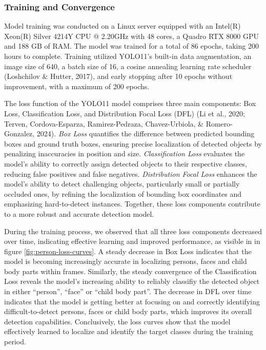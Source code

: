 \documentclass[
  man,floatsintext]{apa6}
\begin{document}
\subsubsection{Training and Convergence}\label{training-and-convergence}

Model training was conducted on a Linux server equipped with an Intel(R) Xeon(R) Silver 4214Y CPU @ 2.20GHz with 48 cores, a Quadro RTX 8000 GPU and 188 GB of RAM. The model was trained for a total of 86 epochs, taking 200 hours to complete. Training utilized YOLO11's built-in data augmentation, an image size of 640, a batch size of 16, a cosine annealing learning rate scheduler (Loshchilov \& Hutter, 2017), and early stopping after 10 epochs without improvement, with a maximum of 200 epochs.

The loss function of the YOLO11 model comprises three main components: Box Loss, Classification Loss, and Distribution Focal Loss (DFL) (Li et al., 2020; Terven, Cordova-Esparza, Ramirez-Pedraza, Chavez-Urbiola, \& Romero-Gonzalez, 2024). \emph{Box Loss} quantifies the difference between predicted bounding boxes and ground truth boxes, ensuring precise localization of detected objects by penalizing inaccuracies in position and size. \emph{Classification Loss} evaluates the model's ability to correctly assign detected objects to their respective classes, reducing false positives and false negatives. \emph{Distribution Focal Loss} enhances the model's ability to detect challenging objects, particularly small or partially occluded ones, by refining the localization of bounding box coordinates and emphasizing hard-to-detect instances. Together, these loss components contribute to a more robust and accurate detection model.

During the training process, we observed that all three loss components decreased over time, indicating effective learning and improved performance, as visible in in figure \ref{fig:person-loss-curves}. A steady decrease in Box Loss indicates that the model is becoming increasingly accurate in localizing persons, faces and child body parts within frames. Similarly, the steady convergence of the Classification Loss reveals the model's increasing ability to reliably classifiy the detected object in either ``person'', ``face'' or ``child body part''. The decrease in DFL over time indicates that the model is getting better at focusing on and correctly identifying difficult-to-detect persons, faces or child body parts, which improves its overall detection capabilities. Conclusively, the loss curves show that the model effectively learned to localize and identify the target classes during the training period.
\end{document}
